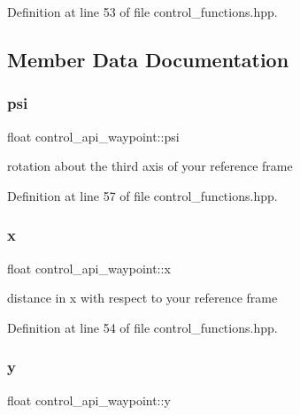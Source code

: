 Definition at line 53 of file control\+\_\+functions.\+hpp.



\subsection{Member Data Documentation}
\mbox{\label{structcontrol__api__waypoint_a053fed6c42cdeda2029d2db548f357b4}} 
\subsubsection{\texorpdfstring{psi}{psi}}
{\footnotesize\ttfamily float control\+\_\+api\+\_\+waypoint\+::psi}



rotation about the third axis of your reference frame 



Definition at line 57 of file control\+\_\+functions.\+hpp.

\mbox{\label{structcontrol__api__waypoint_a381813ee0649f54116dec8d8ed78b26e}} 
\subsubsection{\texorpdfstring{x}{x}}
{\footnotesize\ttfamily float control\+\_\+api\+\_\+waypoint\+::x}



distance in x with respect to your reference frame 



Definition at line 54 of file control\+\_\+functions.\+hpp.

\mbox{\label{structcontrol__api__waypoint_ac92d8860930259ccb19aa91072d94546}} 
\subsubsection{\texorpdfstring{y}{y}}
{\footnotesize\ttfamily float control\+\_\+api\+\_\+waypoint\+::y}



